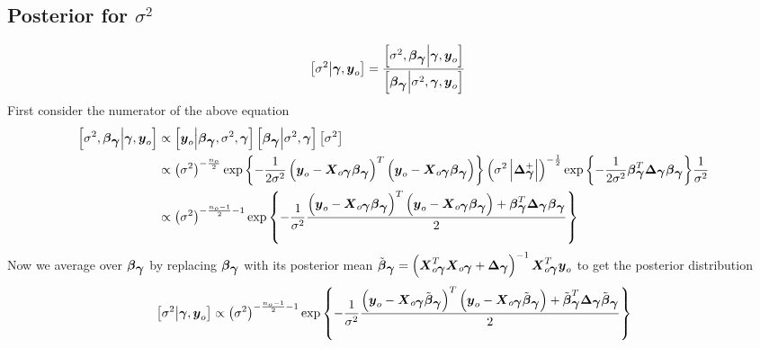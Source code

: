 \documentclass[fleqn]{article}
\def\bm#1{\mbox{\boldmath $#1$}}
\begin{document}
\subsection{Posterior for $\sigma^2$}
%
\begin{align*}
%
\left[ \sigma^2 \middle| \bm{\gamma}, \bm{y}_o \right] & = \frac{\left[ \sigma^2, \bm{\beta}_{\bm{\gamma}} \middle| \bm{\gamma}, \bm{y}_o \right]} {\left[ \bm{\beta}_{\bm{\gamma}} \middle| \sigma^2, \bm{\gamma}, \bm{y}_o \right]}
%
\end{align*}
%
First consider the numerator of the above equation
%
\begin{align*}
%
\left[ \sigma^2, \bm{\beta}_{\bm{\gamma}} \middle| \bm{\gamma}, \bm{y}_o \right] & \propto \left[ \bm{y}_o \middle| \bm{\beta}_{\bm{\gamma}}, \sigma^2, \bm{\gamma} \right] \left[ \bm{\beta}_{\bm{\gamma}} \middle| \sigma^2, \bm{\gamma} \right] \left[ \sigma^2 \right]\\
%
& \propto \left( \sigma^2 \right)^{ - \frac{n_o} {2}} \exp{ \left\{ - \frac{1} {2 \sigma^2} \left( \bm{y}_o - \bm{X}_{o \bm{\gamma}} \bm{\beta}_{\bm{\gamma}} \right)^T \left( \bm{y}_o - \bm{X}_{o \bm{\gamma}} \bm{\beta}_{\bm{\gamma}} \right) \right\} } \left( \sigma^2 \left| \bm{\Delta}_{\bm{\gamma}}^+ \right| \right)^{ - \frac{1} {2}} \exp{ \left\{ - \frac{1} {2 \sigma^2} \bm{\beta}_{\bm{\gamma}}^T \bm{\Delta}_{\bm{\gamma}} \bm{\beta}_{\bm{\gamma}} \right\} } \frac{1} {\sigma^2}\\
%
& \propto \left( \sigma^2 \right)^{ - \frac{n_o - 1} {2} - 1} \exp{ \left\{ - \frac{1} {\sigma^2} \frac{ \left( \bm{y}_o - \bm{X}_{o \bm{\gamma}} \bm{\beta}_{\bm{\gamma}} \right)^T \left( \bm{y}_o - \bm{X}_{o \bm{\gamma}} \bm{\beta}_{\bm{\gamma}} \right) + \bm{\beta}_{\bm{\gamma}}^T \bm{\Delta}_{\bm{\gamma}} \bm{\beta}_{\bm{\gamma}} } {2} \right\} } \\
%
\end{align*}
%
Now we average over $\bm{\beta}_{\bm{\gamma}}$ by replacing $\bm{\beta}_{\bm{\gamma}}$ with its posterior mean $\tilde{\bm{\beta}}_{\bm{\gamma}} = \left( \bm{X}_{o \bm{\gamma}}^T \bm{X}_{o \bm{\gamma}} + \bm{\Delta}_{\bm{\gamma}} \right)^{ - 1} \bm{X}_{o \bm{\gamma}}^T \bm{y}_o$ to get the posterior distribution
%
\begin{align*}
%
\left[ \sigma^2 \middle| \bm{\gamma}, \bm{y}_o \right] & \propto  \left( \sigma^2 \right)^{ - \frac{n_o - 1} {2} - 1} \exp{ \left\{ - \frac{1} {\sigma^2} \frac{ \left( \bm{y}_o - \bm{X}_{o \bm{\gamma}} \tilde{\bm{\beta}}_{\bm{\gamma}} \right)^T \left( \bm{y}_o - \bm{X}_{o \bm{\gamma}} \tilde{\bm{\beta}}_{\bm{\gamma}} \right) + \tilde{\bm{\beta}}_{\bm{\gamma}}^T \bm{\Delta}_{\bm{\gamma}} \tilde{\bm{\beta}}_{\bm{\gamma}} } {2} \right\} } \\
%
\end{align*}  
\end{document}
